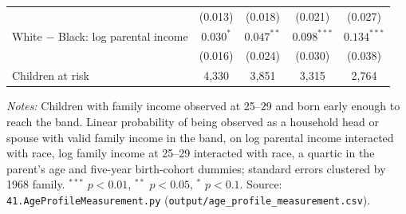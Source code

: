 \begin{table}[!htbp]
{{\begin{tabular}{lcccc}
 & (0.013) & (0.018) & (0.021) & (0.027) \\
White $-$ Black: log parental income & $0.030^{*}$ & $0.047^{**}$ & $0.098^{***}$ & $0.134^{***}$ \\
 & (0.016) & (0.024) & (0.030) & (0.038) \\
Children at risk & 4,330 & 3,851 & 3,315 & 2,764 \\
\bottomrule
\end{tabular}}}
\par\smallskip
\begin{minipage}{\textwidth}\footnotesize \textit{Notes:} Children with family income observed at 25--29 and born early enough to reach the band. Linear probability of being observed as a household head or spouse with valid family income in the band, on log parental income interacted with race, log family income at 25--29 interacted with race, a quartic in the parent's age and five-year birth-cohort dummies; standard errors clustered by 1968 family. $^{***}$ $p<0.01$, $^{**}$ $p<0.05$, $^{*}$ $p<0.1$. Source: \texttt{41.AgeProfileMeasurement.py} (\texttt{output/age\_profile\_measurement.csv}).\end{minipage}
\end{table}
